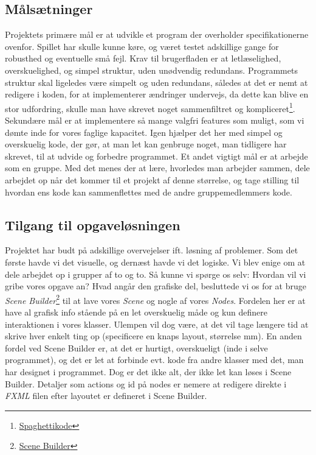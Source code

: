 \subsection{Målsætninger}
Projektets primære mål er at udvikle et program der overholder specifikationerne ovenfor. Spillet har skulle kunne køre, og været testet adskillige gange for robusthed og eventuelle små fejl.\newline
Krav til brugerfladen er at letlæselighed, overskuelighed, og simpel struktur, uden unødvendig redundans. \newline
Programmets struktur skal ligeledes være simpelt og uden redundans, således at det er nemt at redigere i koden, for at implementerer ændringer undervejs, da dette kan blive en stor udfordring, skulle man have skrevet noget sammenfiltret og kompliceret\footnote{\href{https://www.wikiwand.com/en/Spaghetti_code}{Spaghettikode}}.\newline
Sekundære mål er at implementere så mange valgfri features som muligt, som vi dømte inde for vores faglige kapacitet. Igen hjælper det her med simpel og overskuelig kode, der gør, at man let kan genbruge noget, man tidligere har skrevet, til at udvide og forbedre programmet.\newline
Et andet vigtigt mål er at arbejde som en gruppe. Med det menes der at lære, hvorledes man arbejder sammen, dele arbejdet op når det kommer til et projekt af denne størrelse, og tage stilling til hvordan ens kode kan sammenflettes med de andre gruppemedlemmers kode.
\subsection{Tilgang til opgaveløsningen}
Projektet har budt på adskillige overvejelser ift. løsning af problemer. Som det første havde vi det visuelle, og dernæst havde vi det logiske. Vi blev enige om at dele arbejdet op i grupper af to og to. Så kunne vi spørge os selv: Hvordan vil vi gribe vores opgave an? Hvad angår den grafiske del, besluttede vi os for at bruge \emph{Scene Builder}\footnote{\href{https://gluonhq.com/products/scene-builder/}{Scene Builder}} til at lave vores \emph{Scene} og nogle af vores \emph{Nodes}. Fordelen her er at have al grafisk info stående på en let overskuelig måde og kun definere interaktionen i vores klasser. Ulempen vil dog være, at det vil tage længere tid at skrive hver enkelt ting op (specificere en knaps layout, størrelse mm). En anden fordel ved Scene Builder er, at det er hurtigt, overskueligt (inde i selve programmet), og det er let at forbinde evt. kode fra andre klasser med det, man har designet i programmet.\newline
Dog er det ikke alt, der ikke let kan løses i Scene Builder. Detaljer som actions og id på nodes er nemere at redigere direkte i \emph{FXML} filen efter layoutet er defineret i Scene Builder.\newline



